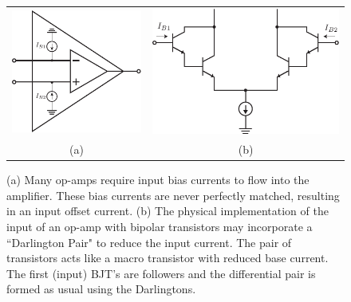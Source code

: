 \begin{figure}[tb]
\begin{center}
\begin{tabular}{cc}
\includegraphics[scale=1]{opamp_offset_I} &
\includegraphics[scale=1]{bjt_input_darlington} \\
(a) & (b) \\
\end{tabular}
\end{center}
\caption{(a) Many op-amps require input bias currents to flow into the amplifier.  These bias currents are never perfectly matched, resulting in an input offset current. (b) The physical implementation of the input of an op-amp with bipolar transistors may incorporate a ``Darlington Pair" to reduce the input current. The pair of transistors acts like a macro transistor with reduced base current. The first (input) BJT's are followers and the differential pair is formed as usual using the Darlingtons.} \label{fig:opamp_offset_I}
\end{figure}


